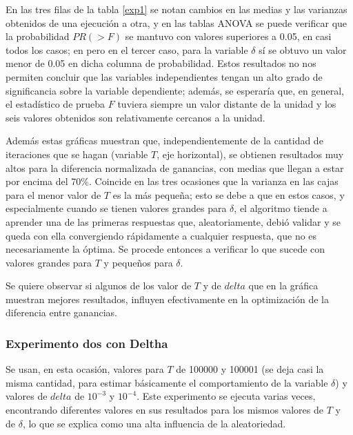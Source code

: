 En las tres filas de la tabla \ref{exp1} se notan cambios en las medias y las varianzas obtenidos de una ejecución a otra, y en las tablas ANOVA se puede verificar que la probabilidad $PR(>F)$ se mantuvo con valores superiores a 0.05, en casi todos los casos; en  pero en el tercer caso, para la variable $\delta$ sí se obtuvo un valor menor de 0.05 en dicha columna de probabilidad. Estos resultados no nos permiten concluir que las variables independientes tengan un alto grado de significancia sobre la variable dependiente; además, se esperaría que, en general, el estadístico de prueba $F$ tuviera siempre un valor distante de la unidad y los seis valores obtenidos son relativamente cercanos a la unidad. 

Además estas gráficas muestran que, independientemente de la cantidad de iteraciones que se hagan (variable $T$, eje horizontal), se obtienen resultados muy altos para la diferencia normalizada de ganancias, con medias que llegan a estar por encima del 70\%. Coincide en las tres ocasiones que la varianza en las cajas para el menor valor de $T$ es la más pequeña; esto se debe a que en estos casos, y especialmente cuando se tienen valores grandes para $\delta$, el algoritmo tiende a aprender una de las primeras respuestas que, aleatoriamente, debió validar y se queda con ella convergiendo rápidamente a cualquier respuesta, que no es necesariamente la óptima. Se procede entonces a verificar lo que sucede con valores grandes para $T$ y pequeños para $\delta$.

Se quiere observar si algunos de los valor de $T$ y de $delta$ que en la gráfica muestran mejores resultados, influyen efectivamente en la optimización de la diferencia entre ganancias.

\subsubsection{Experimento dos con Deltha}


Se usan, en esta ocasión, valores para $T$ de 100000 y 100001 (se deja casi la misma cantidad, para estimar básicamente el comportamiento de la variable $\delta$) y valores de $delta$ de $10^{-3}$ y $10^{-4}$. Este experimento se ejecuta varias veces, encontrando diferentes valores en sus resultados para los mismos valores de $T$ y de $\delta$, lo que se explica como una alta influencia de la aleatoriedad. 

